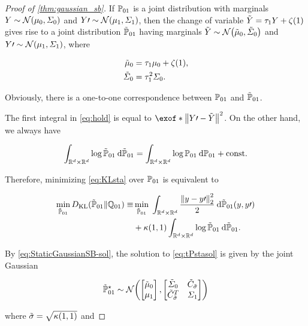 \begin{proof}[Proof of \cref{thm:gaussian_sb}]
If $\mathbb{P}_{{01}}$ is a joint distribution with marginals $Y \sim \Ncal\parens*{ \m, \covar}$ and $Y\prime\sim\Ncal\parens*{ \malt, \covaralt}$, then the change of variable $\tilde{Y} = \aggtime[\horizon]Y + \tshift[\horizon]$ gives rise to a joint distribution $\tilde{\mathbb{P}}_{\mathrm{01}}$ having marginals $\tilde{Y} \sim \Ncal\parens*{ \tm, \tcovar}$ and $Y\prime\sim\Ncal\parens*{ \malt, \covaralt}$, where

\begin{align}
\tm &= \aggtime[\horizon]\m + \tshift[\horizon], \\
\tcovar &= \aggtimesq[\horizon] \covar.
\end{align}

Obviously, there is a one-to-one correspondence between $\mathbb{P}_{{01}}$ and $\tilde{\mathbb{P}}_{\mathrm{01}}$.

The first integral in \eqref{eq:hold} is equal to $ \exof*{  \norm*{  Y\prime- \tilde{Y} }^2 }$. On the other hand, we always have 

\begin{equation}
\nonumber
\int_{\mathbb{R}^{d} \times \mathbb{R}^{d} } \log  \tilde{\mathbb{P}}_{\mathrm{01}}  \:\mathrm{d} \tilde{\mathbb{P}}_{\mathrm{01}} =\int_{\mathbb{R}^{d} \times \mathbb{R}^{d} } \log  \mathbb{P}_{{01}}  \:\mathrm{d} \mathbb{P}_{{01}} +\mathrm{const.}
\end{equation}


Therefore, minimizing \eqref{eq:KLsta} over $\mathbb{P}_{{01}}$ is equivalent to

\begin{align}
\label{eq:tPstasol}
\min_{ \tPsta} \KL( \tPsta \| \Qsta)\equiv &\min_{ \tPsta}\; \intRR  \frac{ \norm*{ y - y\prime}_2^2}{2} \dd \tPsta(y, y\prime) \\
&+  \kernel[\horizon][\horizon]\intRR \log  \tPsta  \dd \tPsta.
\end{align}

By \eqref{eq:StaticGaussianSB-sol}, the solution to \eqref{eq:tPstasol} is given by the joint Gaussian 

\begin{align}
\tPstasol \sim \Ncal \parens*{  \begin{bmatrix}
\tm \\
\malt
\end{bmatrix},  \begin{bmatrix}
\tcovar & \tilde{C}_{\tilde{\sdev}    } \\
\tilde{C}_{ \tilde{\sdev}}^T  & \covaralt
\end{bmatrix}}
\end{align}

where $\tilde{\sdev} = \sqrt{ \kernel[\horizon][\horizon]}$ and


\end{proof}
